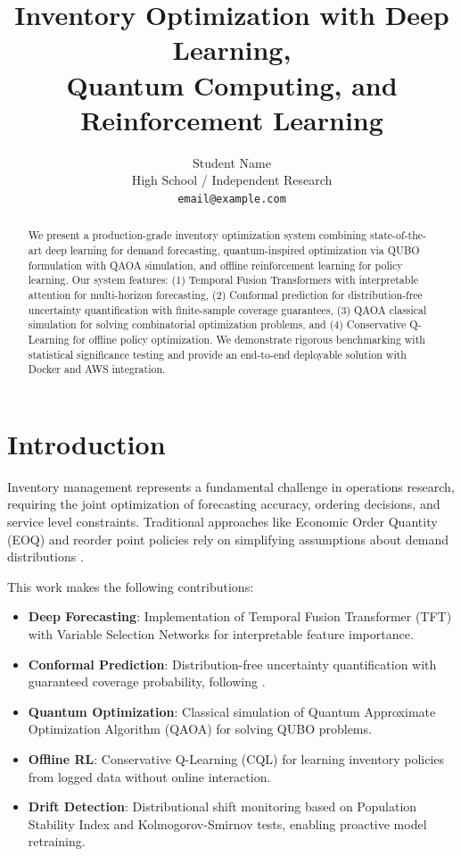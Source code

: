 \documentclass{article}
\title{Inventory Optimization with Deep Learning, \\Quantum Computing, and Reinforcement Learning}
\author{
  Student Name \\
  High School / Independent Research \\
  \texttt{email@example.com}
}
\begin{document}
\maketitle

\begin{abstract}
We present a production-grade inventory optimization system combining state-of-the-art 
deep learning for demand forecasting, quantum-inspired optimization via QUBO formulation 
with QAOA simulation, and offline reinforcement learning for policy learning. Our system 
features: (1) Temporal Fusion Transformers with interpretable attention for multi-horizon 
forecasting, (2) Conformal prediction for distribution-free uncertainty quantification with 
finite-sample coverage guarantees, (3) QAOA classical simulation for solving combinatorial 
optimization problems, and (4) Conservative Q-Learning for offline policy optimization. 
We demonstrate rigorous benchmarking with statistical significance testing and provide 
an end-to-end deployable solution with Docker and AWS integration.
\end{abstract}

\section{Introduction}

Inventory management represents a fundamental challenge in operations research, requiring 
the joint optimization of forecasting accuracy, ordering decisions, and service level 
constraints. Traditional approaches like Economic Order Quantity (EOQ) and reorder point 
policies rely on simplifying assumptions about demand distributions \cite{silver2016}.

This work makes the following contributions:
\begin{itemize}
    \item \textbf{Deep Forecasting}: Implementation of Temporal Fusion Transformer (TFT) 
    \cite{lim2021temporal} with Variable Selection Networks for interpretable feature importance.
    
    \item \textbf{Conformal Prediction}: Distribution-free uncertainty quantification with 
    guaranteed coverage probability, following \cite{romano2019conformalized}.
    
    \item \textbf{Quantum Optimization}: Classical simulation of Quantum Approximate 
    Optimization Algorithm (QAOA) \cite{farhi2014quantum} for solving QUBO problems.
    
    \item \textbf{Offline RL}: Conservative Q-Learning (CQL) \cite{kumar2020conservative} 
    for learning inventory policies from logged data without online interaction.
    
    \item \textbf{Drift Detection}: Distributional shift monitoring based on Population 
    Stability Index and Kolmogorov-Smirnov tests, enabling proactive model retraining.
\end{itemize}
\end{document}
